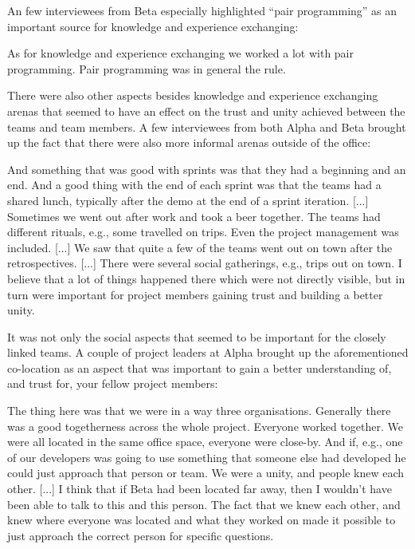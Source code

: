 An few interviewees from Beta especially highlighted ``pair programming'' as an important source for knowledge and experience exchanging:

\begin{fancyquotes}
As for knowledge and experience exchanging we worked a lot with pair programming. Pair programming was in general the rule.
\end{fancyquotes}

There were also other aspects besides knowledge and experience exchanging arenas that seemed to have an effect on the trust and unity achieved between the teams and team members. A few interviewees from both Alpha and Beta brought up the fact that there were also more informal arenas outside of the office:

\begin{fancyquotes}
And something that was good with sprints was that they had a beginning and an end. And a good thing with the end of each sprint was that the teams had a shared lunch, typically after the demo at the end of a sprint iteration. [...] Sometimes we went out after work and took a beer together. The teams had different rituals, e.g., some travelled on trips. Even the project management was included. [...] We saw that quite a few of the teams went out on town after the retrospectives. [...] There were several social gatherings, e.g., trips out on town. I believe that a lot of things happened there which were not directly visible, but in turn were important for project members gaining trust and building a better unity.
\end{fancyquotes}

It was not only the social aspects that seemed to be important for the closely linked teams. A couple of project leaders at Alpha brought up the aforementioned co-location as an aspect that was important to gain a better understanding of, and trust for, your fellow project members:

\begin{fancyquotes}
The thing here was that we were in a way three organisations. Generally there was a good togetherness across the whole project. Everyone worked together. We were all located in the same office space, everyone were close-by. And if, e.g., one of our developers was going to use something that someone else had developed he could just approach that person or team. We were a unity, and people knew each other. [...] I think that if Beta had been located far away, then I wouldn't have been able to talk to this and this person. The fact that we knew each other, and knew where everyone was located and what they worked on made it possible to just approach the correct person for specific questions.
\end{fancyquotes}

